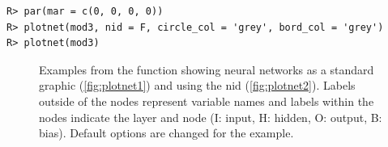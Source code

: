 \documentclass[article,shortnames]{jss}\usepackage[]{graphicx}\usepackage[]{color}
\makeatletter
\newenvironment{kframe}{%
 \def\at@end@of@kframe{}%
 \ifinner\ifhmode%
  \def\at@end@of@kframe{\end{minipage}}%
  \begin{minipage}{\columnwidth}%
 \fi\fi%
 \def\FrameCommand##1{\hskip\@totalleftmargin \hskip-\fboxsep
 \colorbox{shadecolor}{##1}\hskip-\fboxsep
     \hskip-\linewidth \hskip-\@totalleftmargin \hskip\columnwidth}%
 \MakeFramed {\advance\hsize-\width
   \@totalleftmargin\z@ \linewidth\hsize
   \@setminipage}}%
 {\par\unskip\endMakeFramed%
 \at@end@of@kframe}
\newenvironment{knitrout}{}{} %
\makeatother
\begin{document}
\begin{knitrout}
\color{fgcolor}\begin{kframe}
\begin{verbatim}
R> par(mar = c(0, 0, 0, 0))
R> plotnet(mod3, nid = F, circle_col = 'grey', bord_col = 'grey')
R> plotnet(mod3)
\end{verbatim}
\end{kframe}\begin{figure}[!ht]

{\centering {}

}

\caption{Examples from the  function showing neural networks as a standard graphic (\ref{fig:plotnet1}) and using the \acl{nid} (\ref{fig:plotnet2}).  Labels outside of the nodes represent variable names and labels within the nodes indicate the layer and node (I: input, H: hidden, O: output, B: bias).  Default options are changed for the example.}\label{fig:plotnet}
\end{figure}


\end{knitrout}
\end{document}
